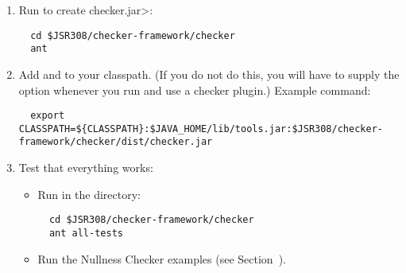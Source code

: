\begin{enumerate}

\item
Run  to create \<checker.jar>:

\begin{Verbatim}
  cd $JSR308/checker-framework/checker
  ant
\end{Verbatim}

\item Add  and  to your classpath.
  (If you do not do this, you will have to supply the  option
  whenever you run  and use a checker plugin.)
  Example command:

\begin{smaller}
\begin{Verbatim}
  export CLASSPATH=${CLASSPATH}:$JAVA_HOME/lib/tools.jar:$JSR308/checker-framework/checker/dist/checker.jar
\end{Verbatim}
\end{smaller}

\item Test that everything works:

  \begin{itemize}

  \item Run  in the  directory:
\begin{Verbatim}
  cd $JSR308/checker-framework/checker
  ant all-tests
\end{Verbatim}

  \item Run the Nullness Checker examples (see
    Section~).

  \end{itemize}

\end{enumerate}

